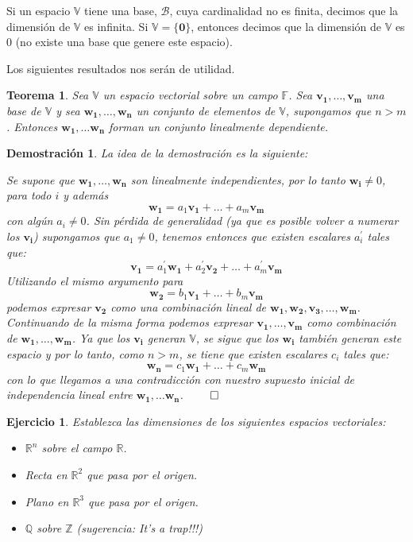 \documentclass[11pt]{report}
\theoremstyle{break}
\newtheorem{teorema}{Teorema}[chapter]
\newtheorem*{demostracion}{Demostración}
\newtheorem{ejercicio}{Ejercicio}[chapter]
\theoremstyle{break}
\newcommand{\mbb}[1]{$\mathbb{#1}$}
\begin{document}
Si un espacio \mbb{V} tiene una base, $\mathcal{B}$, cuya cardinalidad no es finita, decimos que la dimensión de \mbb{V} es infinita.
Si $\mathbb{V} = \{ \bm{0} \}$, entonces decimos que la dimensión de \mbb{V} es $0$ (no existe una base que genere este espacio).

Los siguientes resultados nos serán de utilidad.

\begin{teorema}
\label{teorema:conjuntos-maximales}
Sea \mbb{V} un espacio vectorial sobre un campo \mbb{F}. Sea $\bm{v_1}, \ldots, \bm{v_m}$ una base de \mbb{V} y sea $\bm{w_1}, \ldots, \bm{w_n}$ un conjunto de elementos de \mbb{V}, supongamos que $n > m$. Entonces $\bm{w_1}, \ldots \bm{w_n}$ forman un conjunto linealmente dependiente.
\end{teorema}
\begin{demostracion}
La idea de la demostración es la siguiente:

Se supone que $\bm{w_1}, \ldots, \bm{w_n}$ son linealmente independientes, por lo tanto $\bm{w_i} \neq 0$, para todo $i$ y además 
$$\bm{w_1} = a_{1}\bm{v_1} + \ldots + a_{m}\bm{v_m}$$
con algún $a_i \neq 0$. Sin pérdida de generalidad (ya que es posible volver a numerar los $\bm{v_i}$) supongamos que $a_1 \neq 0$, tenemos entonces que existen escalares $a_{i}^{'}$ tales que:
$$\bm{v_1} = a_{1}^{'}\bm{w_1} + a_{2}^{'}\bm{v_2} + \ldots + a_{m}^{'} \bm{v_m}$$
Utilizando el mismo argumento para
$$\bm{w_2} = b_{1}\bm{v_1} + \ldots + b_{m}\bm{v_m}$$
podemos expresar $\bm{v_2}$ como una combinación lineal de $\bm{w_1}, \bm{w_2}, \bm{v_3}, \ldots, \bm{w_m}$. Continuando de la misma forma podemos expresar $\bm{v_1}, \ldots, \bm{v_m}$ como combinación de $\bm{w_1}, \ldots, \bm{w_m}$. Ya que los $\bm{v_i}$ generan \mbb{V}, se sigue que los $\bm{w_i}$ también generan este espacio y por lo tanto, como $n > m$, se tiene que existen escalares $c_i$ tales que:
$$\bm{w_n} = c_{1}\bm{w_1} + \ldots + c_{m}\bm{w_m}$$
con lo que llegamos a una contradicción con nuestro supuesto inicial de independencia lineal entre $\bm{w_1}, \ldots \bm{w_n}$. $\qed$
\end{demostracion}


\begin{ejercicio}
Establezca las dimensiones de los siguientes espacios vectoriales:
\begin{itemize}[label=$\bullet$]
\item $\mathbb{R}^n$ sobre el campo $\mathbb{R}$.
\item Recta en $\mathbb{R}^2$ que pasa por el origen.
\item Plano en $\mathbb{R}^3$ que pasa por el origen.
\item \mbb{Q} sobre \mbb{Z} (sugerencia: It's a trap!!!)
\end{itemize}
\end{ejercicio}
\end{document}
